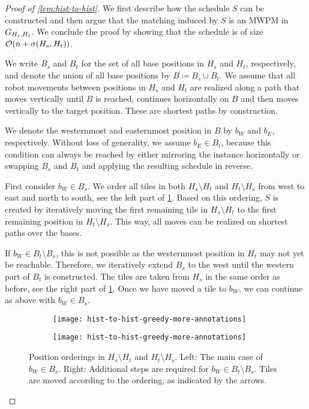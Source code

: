 \begin{proof}[Proof of \cref{lem:hist-to-hist}]
    We first describe how the schedule $S$ can be constructed and
    then argue that the matching induced by $S$ is an MWPM in~$G_{H_s, H_t}$.
    We conclude the proof by showing that the schedule is of size $\mathcal{O}(n + \sigma(H_s,H_t))$.

    We write $B_s$ and $B_t$ for the set of all base positions in $H_s$ and $H_t$, respectively, and denote the union of all base positions by $B \coloneqq B_s \cup B_t$.
    We assume that all robot movements between positions in $H_s$ and $H_t$ are realized along a path that moves vertically until $B$ is reached, continues horizontally on $B$ and then moves vertically to the target position.
    These are shortest paths by construction.

    We denote the westernmost and easternmost position in $B$ by $b_W$ and $b_E$, respectively.
    Without loss of generality, we assume $b_E \in B_t$, because this condition can always be reached by either mirroring the instance horizontally or swapping $B_s$ and $B_t$ and applying the resulting schedule in reverse.

    First consider $b_W \in B_s$.
    We order all tiles in both $H_s \setminus H_t$ and $H_t \setminus H_s$ from west to east and north to south, see the left part of \cref{fig:hist-to-hist-greedy}.
    Based on this ordering, $S$ is created by iteratively moving the first remaining tile in $H_s \setminus H_t$ to the first remaining position in $H_t \setminus H_s$.
    This way, all moves can be realized on shortest paths over the bases.

    If $b_W \in B_t \setminus B_s$, this is not possible as the westernmost position in $H_t$ may not yet be reachable.
    Therefore, we iteratively extend $B_s$ to the west until the western part of $B_t$ is constructed.
    The tiles are taken from $H_s$ in the same order as before, see the right part of \cref{fig:hist-to-hist-greedy}.
    Once we have moved a tile to $b_W$, we can continue as above with $b_W \in B_s$.

	\begin{figure}[htb]
		\begin{subfigure}[t]{0.5\columnwidth}
			\centering%
			\texttt{[image: hist-to-hist-greedy-more-annotations]}%
		\end{subfigure}%
		\begin{subfigure}[t]{0.5\columnwidth}
			\centering%
			\texttt{[image: hist-to-hist-greedy-more-annotations]}%
		\end{subfigure}%
		\caption{%
            Position orderings in $H_s\setminus H_t$ and $H_t\setminus H_s$.
            Left: The main case of $b_W \in B_s$.
            Right: Additional steps are required for $b_W \in B_t \setminus B_s$.
            Tiles are moved according to the ordering, as indicated by the arrows.
        }
		\label{fig:hist-to-hist-greedy}
	\end{figure}


\end{proof}
